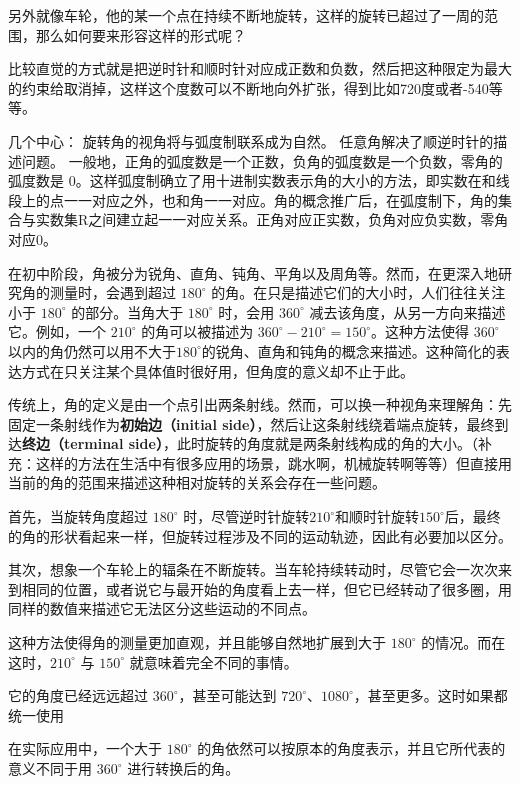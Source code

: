 另外就像车轮，他的某一个点在持续不断地旋转，这样的旋转已超过了一周的范围，那么如何要来形容这样的形式呢？

比较直觉的方式就是把逆时针和顺时针对应成正数和负数，然后把这种限定为最大的约束给取消掉，这样这个度数可以不断地向外扩张，得到比如720度或者-540等等。

几个中心：
旋转角的视角将与弧度制联系成为自然。
任意角解决了顺逆时针的描述问题。
一般地，正角的弧度数是一个正数，负角的弧度数是一个负数，零角的弧度数是 $0$。这样弧度制确立了用十进制实数表示角的大小的方法，即实数在和线段上的点一一对应之外，也和角一一对应。角的概念推广后，在弧度制下，角的集合与实数集R之间建立起一一对应关系。正角对应正实数，负角对应负实数，零角对应0。





在初中阶段，角被分为锐角、直角、钝角、平角以及周角等。然而，在更深入地研究角的测量时，会遇到超过 $180^\circ$ 的角。在只是描述它们的大小时，人们往往关注小于 $180^\circ$ 的部分。当角大于 $180^\circ$ 时，会用 $360^\circ$ 减去该角度，从另一方向来描述它。例如，一个 $210^\circ$ 的角可以被描述为 $360^\circ - 210^\circ = 150^\circ$。这种方法使得 $360^\circ$ 以内的角仍然可以用不大于$180^\circ$的锐角、直角和钝角的概念来描述。这种简化的表达方式在只关注某个具体值时很好用，但角度的意义却不止于此。

传统上，角的定义是由一个点引出两条射线。然而，可以换一种视角来理解角：先固定一条射线作为\textbf{初始边（initial side）}，然后让这条射线绕着端点旋转，最终到达\textbf{终边（terminal side）}，此时旋转的角度就是两条射线构成的角的大小。（补充：这样的方法在生活中有很多应用的场景，跳水啊，机械旋转啊等等）但直接用当前的角的范围来描述这种相对旋转的关系会存在一些问题。

首先，当旋转角度超过 $180^\circ$ 时，尽管逆时针旋转$210^\circ$和顺时针旋转$150^\circ$后，最终的角的形状看起来一样，但旋转过程涉及不同的运动轨迹，因此有必要加以区分。

其次，想象一个车轮上的辐条在不断旋转。当车轮持续转动时，尽管它会一次次来到相同的位置，或者说它与最开始的角度看上去一样，但它已经转动了很多圈，用同样的数值来描述它无法区分这些运动的不同点。




这种方法使得角的测量更加直观，并且能够自然地扩展到大于 $180^\circ$ 的情况。而在这时，$210^\circ$ 与 $150^\circ$ 就意味着完全不同的事情。

它的角度已经远远超过 $360^\circ$，甚至可能达到 $720^\circ$、$1080^\circ$，甚至更多。这时如果都统一使用

在实际应用中，一个大于 $180^\circ$ 的角依然可以按原本的角度表示，并且它所代表的意义不同于用 $360^\circ$ 进行转换后的角。


